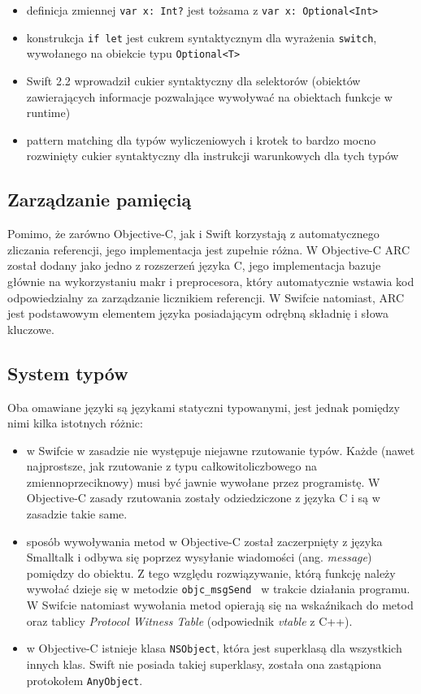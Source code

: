 \documentclass[mgr, shortabstract]{iithesis}
\newcommand{\ang}[1]{ang. \textit{#1}}
\begin{document}
\begin{itemize}
    \item definicja zmiennej \texttt{var x: Int?} jest tożsama z \texttt{var x: Optional<Int>}
    \item konstrukcja \texttt{if let} jest cukrem syntaktycznym dla wyrażenia \texttt{switch}, wywołanego na obiekcie typu \texttt{Optional<T>}
    \item Swift 2.2 wprowadził cukier syntaktyczny dla selektorów (obiektów zawierających informacje pozwalające wywoływać na obiektach funkcje w runtime)
    \item pattern matching dla typów wyliczeniowych i krotek to bardzo mocno rozwinięty cukier syntaktyczny dla instrukcji warunkowych dla tych typów
\end{itemize}

\subsection{Zarządzanie pamięcią}

Pomimo, że zarówno Objective-C, jak i Swift korzystają z automatycznego zliczania referencji, jego implementacja jest zupełnie różna. W Objective-C ARC został dodany jako jedno z rozszerzeń języka C, jego implementacja bazuje głównie na wykorzystaniu makr i preprocesora, który automatycznie wstawia kod odpowiedzialny za zarządzanie licznikiem referencji. W Swifcie natomiast, ARC jest podstawowym elementem języka posiadającym odrębną składnię i słowa kluczowe.

\subsection{System typów}
\label{s:system_typow}

Oba omawiane języki są językami statyczni typowanymi, jest jednak pomiędzy nimi kilka istotnych różnic:

\begin{itemize}

    \item w Swifcie w zasadzie nie występuje niejawne rzutowanie typów. Każde (nawet najprostsze, jak rzutowanie z typu całkowitoliczbowego na zmiennoprzeciknowy) musi być jawnie wywołane przez programistę. W Objective-C zasady rzutowania zostały odziedziczone z języka C i są w zasadzie takie same.
    \item sposób wywoływania metod w Objective-C został zaczerpnięty z języka Smalltalk i odbywa się poprzez wysyłanie wiadomości (\ang{message}) pomiędzy do obiektu. Z tego względu rozwiązywanie, którą funkcję należy wywołać dzieje się w metodzie \texttt{objc_msgSend } w trakcie działania programu. W Swifcie natomiast wywołania metod opierają się na wskaźnikach do metod oraz tablicy \textit{Protocol Witness Table} (odpowiednik \textit{vtable} z C++).
    \item w Objective-C istnieje klasa \texttt{NSObject}, która jest superklasą dla wszystkich innych klas. Swift nie posiada takiej superklasy, została ona zastąpiona protokołem \texttt{AnyObject}.

\end{itemize}
\end{document}
